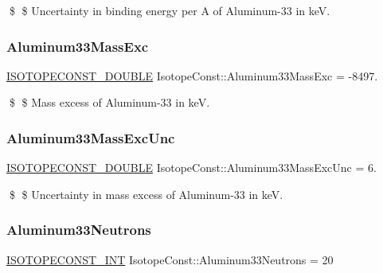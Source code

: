 \$ \$ Uncertainty in binding energy per A of Aluminum-\/33 in keV. \mbox{\label{group___isotope_const-_aluminum-_al33_ga7426f93c42cd6111c84c9695c46270a0}} 
\subsubsection{\texorpdfstring{Aluminum33\+Mass\+Exc}{Aluminum33MassExc}}
{\footnotesize\ttfamily \mbox{\hyperlink{group___isotope_const-_macros_ga8f45a7272ce02c0b4c65c44636ed719a}{I\+S\+O\+T\+O\+P\+E\+C\+O\+N\+S\+T\+\_\+\+D\+O\+U\+B\+LE}} Isotope\+Const\+::\+Aluminum33\+Mass\+Exc = -\/8497.}

\$ \$ Mass excess of Aluminum-\/33 in keV. \mbox{\label{group___isotope_const-_aluminum-_al33_gade8cdb1a4a7ffddf8ab4f01ea75598ec}} 
\subsubsection{\texorpdfstring{Aluminum33\+Mass\+Exc\+Unc}{Aluminum33MassExcUnc}}
{\footnotesize\ttfamily \mbox{\hyperlink{group___isotope_const-_macros_ga8f45a7272ce02c0b4c65c44636ed719a}{I\+S\+O\+T\+O\+P\+E\+C\+O\+N\+S\+T\+\_\+\+D\+O\+U\+B\+LE}} Isotope\+Const\+::\+Aluminum33\+Mass\+Exc\+Unc = 6.}

\$ \$ Uncertainty in mass excess of Aluminum-\/33 in keV. \mbox{\label{group___isotope_const-_aluminum-_al33_gaaa3d372a588932dacd7e7ab153703a5b}} 
\subsubsection{\texorpdfstring{Aluminum33\+Neutrons}{Aluminum33Neutrons}}
{\footnotesize\ttfamily \mbox{\hyperlink{group___isotope_const-_macros_ga5f18360b3e99483a35c32d789e62621c}{I\+S\+O\+T\+O\+P\+E\+C\+O\+N\+S\+T\+\_\+\+I\+NT}} Isotope\+Const\+::\+Aluminum33\+Neutrons = 20}

